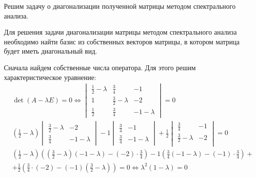 Решим задачу о диагонализации полученной матрицы методом спектрального анализа.

Для решения задачи диагонализации матрицы методом спектрального анализа
необходимо найти базис из собственных векторов матрицы,
в котором матрица будет иметь диагональный вид.

Сначала найдем собственные числа оператора.
Для этого решим характеристическое уравнение:
\begin{align*}
    &\det(A - \lambda E) = 0
    \iff
    \begin{vmatrix}
        \frac{1}{2} - \lambda & \frac{3}{4} & -1\\
        1 & \frac{3}{2} - \lambda & -2\\
        \frac{1}{2} & \frac{3}{4} & -1 - \lambda
    \end{vmatrix} = 0 \\
    &
    \left(\frac{1}{2} - \lambda\right)\begin{vmatrix}
        \frac{3}{2} - \lambda & -2\\
        \frac{3}{4} & -1 - \lambda
    \end{vmatrix} - 1 \begin{vmatrix}
        \frac{3}{4} & -1\\
        \frac{3}{4} & -1 - \lambda
    \end{vmatrix} + \frac{1}{2}\begin{vmatrix}
        \frac{3}{4} & -1\\
        \frac{3}{2} - \lambda & -2\\
    \end{vmatrix} = 0 \\
    &
    \left(\frac{1}{2} - \lambda\right)
    \left(
      (\frac{3}{2} - \lambda)(-1 - \lambda)
      - (-2)\cdot\frac{3}{4}\right)
      - 1 \left(\frac{3}{4}(-1-\lambda) - (-1)\cdot \frac{3}{4}\right) + \\
      &+ \frac{1}{2} \left(
        \frac{3}{4}\cdot(-2) - (-1)(\frac{3}{2}-\lambda)
      \right) = 0
    \iff
    \lambda^2(1 - \lambda) = 0
\end{align*}

